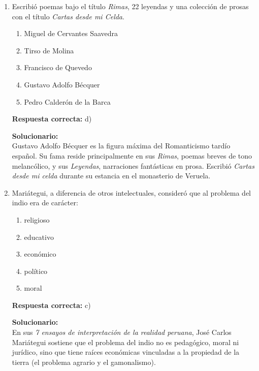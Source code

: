 \begin{enumerate}

\item Escribió poemas bajo el título \textit{Rimas}, 22 leyendas y una colección de prosas con el título \textit{Cartas desde mi Celda}.

\begin{enumerate}[label=\alph*)]
	\item Miguel de Cervantes Saavedra
	\item Tirso de Molina
	\item Francisco de Quevedo
	\item Gustavo Adolfo Bécquer
	\item Pedro Calderón de la Barca
\end{enumerate}

\textbf{Respuesta correcta:} d)

\vspace{2mm}
\textbf{Solucionario:}\\

Gustavo Adolfo Bécquer es la figura máxima del Romanticismo tardío español. Su fama reside principalmente en sus \textit{Rimas}, poemas breves de tono melancólico, y sus \textit{Leyendas}, narraciones fantásticas en prosa. Escribió \textit{Cartas desde mi celda} durante su estancia en el monasterio de Veruela.

\vspace{6mm}

\item Mariátegui, a diferencia de otros intelectuales, consideró que al problema del indio era de carácter:

\begin{enumerate}[label=\alph*)]
	\item religioso
	\item educativo
	\item económico
	\item político
	\item moral
\end{enumerate}

\textbf{Respuesta correcta:} c)

\vspace{2mm}
\textbf{Solucionario:}\\

En sus \textit{7 ensayos de interpretación de la realidad peruana}, José Carlos Mariátegui sostiene que el problema del indio no es pedagógico, moral ni jurídico, sino que tiene raíces económicas vinculadas a la propiedad de la tierra (el problema agrario y el gamonalismo).

\vspace{6mm}


\end{enumerate}






